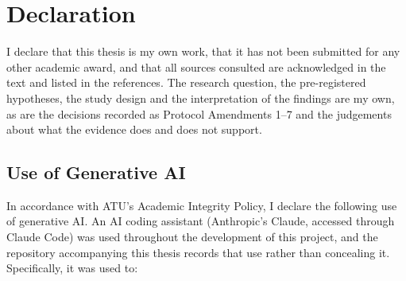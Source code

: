 %
%
%
\chapter*{Declaration}

I declare that this thesis is my own work, that it has not been submitted for
any other academic award, and that all sources consulted are acknowledged in
the text and listed in the references. The research question, the
pre-registered hypotheses, the study design and the interpretation of the
findings are my own, as are the decisions recorded as Protocol Amendments 1--7
and the judgements about what the evidence does and does not support.

\section*{Use of Generative AI}

In accordance with ATU's Academic Integrity Policy, I declare the following use
of generative AI. An AI coding assistant (Anthropic's Claude, accessed through
Claude Code) was used throughout the development of this project, and the
repository accompanying this thesis records that use rather than concealing it.
Specifically, it was used to:

